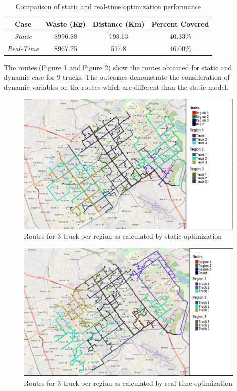 \documentclass[12pt]{article}
\begin{document}
\begin{table}[H]
    \centering
    \caption{Comparison of static and real-time optimization performance} \label{tab5}
    \vspace*{0.3cm}
    \begin{tabular}{|c|c|c|c|}
        \hline Case & Waste (Kg) & Distance (Km) & Percent Covered\\
        \hline \textit{Static}& 8996.88 & 798.13 & 40.33\%\\
        \hline \textit{Real-Time}& 8967.25 & 517.8 & 46.00\%\\
        \hline
    \end{tabular}
\end{table}

The routes (Figure \ref{fig4} and Figure \ref{fig5}) show the routes obtained for static and dynamic case for 9 trucks. The outcomes demonstrate the consideration of dynamic variables on the routes which are different than the static model. 

\begin{figure}[H]
    \centering
    \includegraphics[scale=0.3]{Static_Weighted_3_Truck.png} %
    \caption{Routes for 3 truck per region as calculated by static optimization}\label{fig4}
\end{figure}
\begin{figure}[H]
    \centering
    \includegraphics[scale=0.3]{Dynamic_weighted_3_Truck.png} %
    \caption{Routes for 3 truck per region as calculated by real-time optimization}\label{fig5}
\end{figure}
\end{document}
